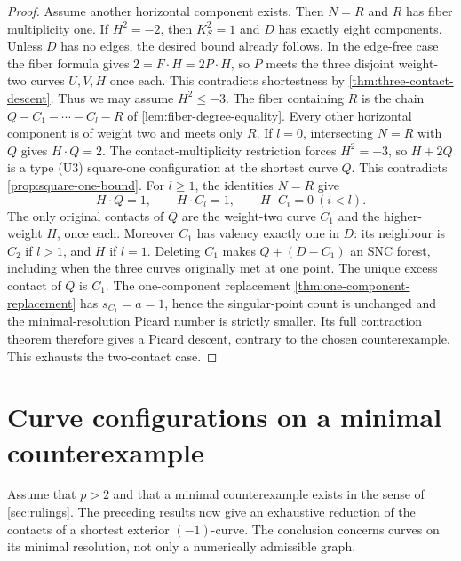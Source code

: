 \documentclass[11pt,reqno]{amsart}
\theoremstyle{definition}
\theoremstyle{remark}
\numberwithin{equation}{section}
\begin{document}
\begin{proof}
Assume another horizontal component exists. Then $N=R$ and $R$ has
fiber multiplicity one. If $H^2=-2$, then $K_S^2=1$ and $D$ has
exactly eight components. Unless $D$ has no edges, the desired bound
already follows. In the edge-free case the fiber formula gives
$2=F\cdot H=2P\cdot H$, so $P$ meets the three disjoint weight-two
curves $U,V,H$ once each. This contradicts shortestness by
\cref{thm:three-contact-descent}.
Thus we may assume $H^2\le-3$.
The fiber containing $R$ is the chain
$Q-C_1-\cdots-C_l-R$ of \cref{lem:fiber-degree-equality}.
Every other horizontal component is of weight two and meets only $R$.
If $l=0$, intersecting $N=R$ with $Q$ gives $H\cdot Q=2$.
The contact-multiplicity restriction forces $H^2=-3$, so $H+2Q$ is a type
\textup{(U3)} square-one configuration at the shortest curve $Q$.
This contradicts \cref{prop:square-one-bound}.
For $l\ge1$, the identities $N=R$ give
\[
 H\cdot Q=1,\qquad H\cdot C_l=1,\qquad
 H\cdot C_i=0\ (i<l).
\]
The only original contacts of $Q$ are the weight-two curve $C_1$ and the
higher-weight $H$, once each. Moreover $C_1$ has valency exactly one
in $D$: its neighbour is $C_2$ if $l>1$, and $H$ if $l=1$.
Deleting $C_1$ makes $Q+(D-C_1)$ an SNC forest, including when the
three curves originally met at one point. The unique excess contact
of $Q$ is $C_1$.
The one-component replacement \cref{thm:one-component-replacement} has
$s_{C_1}=a=1$, hence the singular-point count is unchanged and the minimal-resolution
Picard number is strictly smaller. Its full contraction theorem therefore
gives a Picard descent, contrary to the chosen counterexample.
This exhausts the two-contact case.
\end{proof}


\section{Curve configurations on a minimal counterexample}
\label{sec:reduction}
Assume that $p>2$ and that a minimal counterexample exists in the sense
of \cref{sec:rulings}. The preceding results now give an exhaustive
reduction of the contacts of a shortest exterior $(-1)$-curve. The
conclusion concerns curves on its minimal resolution, not only a
numerically admissible graph.
\end{document}
